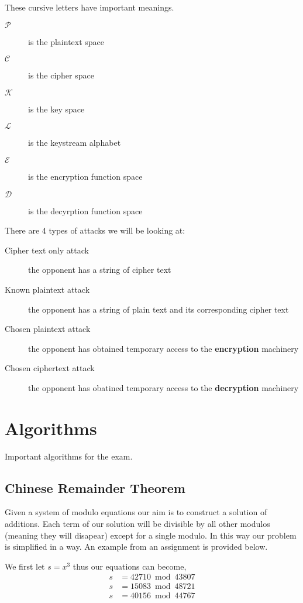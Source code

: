 \documentclass{report}
\begin{document}
These cursive letters have important meanings.
\begin{description}
    \item [$\mathscr{P}$] is the plaintext space
    \item [$\mathscr{C}$] is the cipher space
    \item [$\mathscr{K}$] is the key space
    \item [$\mathscr{L}$] is the keystream alphabet
    \item [$\mathscr{E}$] is the encryption function space
    \item [$\mathscr{D}$] is the decyrption function space
\end{description}

There are 4 types of attacks we will be looking at:
\begin{description}
    \item [Cipher text only attack] the opponent has a string of cipher text
    \item [Known plaintext attack] the opponent has a string of plain text
        and its corresponding cipher text
    \item [Chosen plaintext attack] the opponent has obtained temporary access
        to the \textbf{encryption} machinery
    \item [Chosen ciphertext attack] the opponent has obatined temporary access
        to the \textbf{decryption} machinery
\end{description}

\section{Algorithms}
Important algorithms for the exam.
\subsection{Chinese Remainder Theorem}
Given a system of modulo equations our aim is to construct a solution
of additions. Each term of our solution will be divisible by all other
modulos (meaning they will disapear) except for a single modulo. In this way
our problem is simplified in a way.
An example from an assignment is provided below.

We first let $s = x^3$ thus our equations can become,
\begin{align*}
    s &= 42710 \bmod 43807 \\
    s &= 15083 \bmod 48721 \\
    s &= 40156 \bmod 44767 \\
\end{align*}
\end{document}
